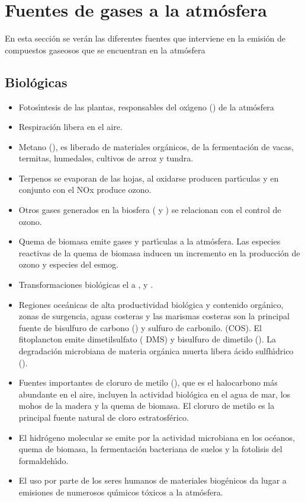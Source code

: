 \section{Fuentes de gases a la atm\'osfera}
\label{fgatm}
En esta secci\'on se ver\'an las diferentes fuentes que interviene en la emisi\'on de compuestos gaseosos que se encuentran en la atm\'osfera

\subsection{Biol\'ogicas}\label{subbio}
\begin{itemize}
\item Fotos\'{\i}ntesis de las plantas, responsables del ox\'{\i}geno () de la atm\'osfera
\item  Respiraci\'on libera  en el aire.
\item  Metano (), es liberado de materiales org\'anicos, de la fermentaci\'on de vacas, termitas, humedales, cultivos de arroz y tundra.
\item  Terpenos  se evaporan de las hojas, al oxidarse producen part\'{\i}culas y en conjunto con el NOx produce ozono. 
\item Otros gases generados en la biosfera ( y ) se relacionan con el control de ozono.
\item Quema de biomasa emite gases y part\'{\i}culas a la atm\'osfera. Las especies reactivas de la quema de biomasa inducen un incremento en la producci\'on de ozono y especies del esmog.
\item  Transformaciones biol\'ogicas el  a ,  y .
\item Regiones oce\'anicas de alta productividad biol\'ogica y contenido org\'anico, zonas de surgencia, aguas costeras y las marismas costeras son la principal fuente de bisulfuro de carbono ()  y sulfuro de carbonilo. (COS). El fitoplancton emite dimetilsulfato ( DMS) y bisulfuro de dimetilo (). La degradaci\'on microbiana de materia org\'anica muerta libera \'acido sulfh\'{\i}drico ().
\item Fuentes importantes de cloruro de metilo (), que es el halocarbono m\'as abundante en el aire, incluyen la actividad biol\'ogica en el agua de mar, los mohos de la madera y la quema de biomasa. El cloruro de metilo es la principal fuente natural de cloro estratosf\'erico.
\item El hidr\'ogeno molecular se emite por la actividad microbiana en los oc\'eanos, quema de biomasa, la fermentaci\'on bacteriana de suelos y la fotolisis del formaldeh\'{\i}do.
\item El uso por parte de los seres humanos de materiales biog\'enicos da lugar a emisiones de numerosos qu\'{\i}micos t\'oxicos a la atm\'osfera.
\end{itemize}
